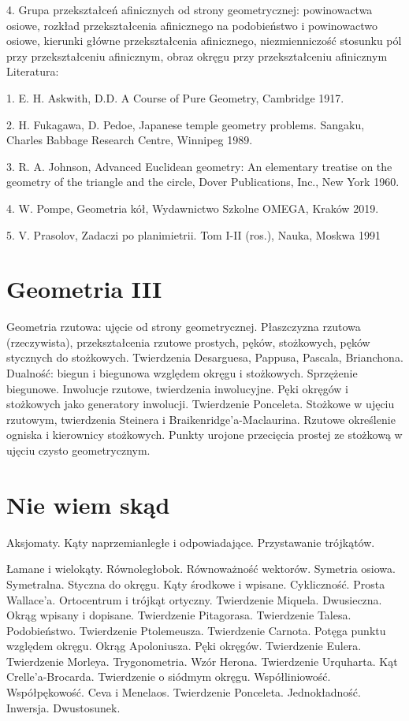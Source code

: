 \documentclass{parchment}
\begin{document}
4. Grupa przekształceń afinicznych od strony geometrycznej: powinowactwa osiowe, rozkład przekształcenia afinicznego na podobieństwo i powinowactwo osiowe, kierunki główne przekształcenia afinicznego, niezmienniczość stosunku pól przy przekształceniu afinicznym, obraz okręgu przy przekształceniu afinicznym
Literatura: 	

1. E. H. Askwith, D.D. A Course of Pure Geometry, Cambridge 1917.

2. H. Fukagawa, D. Pedoe, Japanese temple geometry problems. Sangaku, Charles Babbage Research Centre, Winnipeg 1989.

3. R. A. Johnson, Advanced Euclidean geometry: An elementary treatise on the geometry of the triangle and the circle, Dover Publications, Inc., New York 1960.

4. W. Pompe, Geometria kół, Wydawnictwo Szkolne OMEGA, Kraków 2019.

5. V. Prasolov, Zadaczi po planimietrii. Tom I-II (ros.), Nauka, Moskwa 1991

\section{Geometria III}
Geometria rzutowa: ujęcie od strony geometrycznej. Płaszczyzna rzutowa (rzeczywista), przekształcenia rzutowe prostych, pęków, stożkowych, pęków stycznych do stożkowych.
{\color{gray}
Twierdzenia Desarguesa, Pappusa, Pascala, Brianchona.
}
Dualność: biegun i biegunowa względem okręgu i stożkowych. Sprzężenie biegunowe. Inwolucje rzutowe, twierdzenia inwolucyjne. Pęki okręgów i stożkowych jako generatory inwolucji. Twierdzenie Ponceleta. Stożkowe w ujęciu rzutowym, twierdzenia Steinera i Braikenridge'a-Maclaurina. Rzutowe określenie ogniska i kierownicy stożkowych. Punkty urojone przecięcia prostej ze stożkową w ujęciu czysto geometrycznym.

\section{Nie wiem skąd}
Aksjomaty. Kąty naprzemianległe i odpowiadające.
Przystawanie trójkątów.

Łamane i wielokąty.
Równoległobok.
Równoważność wektorów.
Symetria osiowa.
Symetralna.
Styczna do okręgu.
Kąty środkowe i wpisane.
Cykliczność. Prosta Wallace'a.
Ortocentrum i trójkąt ortyczny.
Twierdzenie Miquela.
Dwusieczna. Okrąg wpisany i dopisane.
Twierdzenie Pitagorasa.
Twierdzenie Talesa.
Podobieństwo.
Twierdzenie Ptolemeusza.
Twierdzenie Carnota.
Potęga punktu względem okręgu.
Okrąg Apoloniusza.
Pęki okręgów.
Twierdzenie Eulera.
Twierdzenie Morleya.
Trygonometria. Wzór Herona.
Twierdzenie Urquharta.
Kąt Crelle'a-Brocarda.
Twierdzenie o siódmym okręgu.
Współliniowość.
Współpękowość.
Ceva i Menelaos.
Twierdzenie Ponceleta.
Jednokładność.
Inwersja.
Dwustosunek.
\end{document}
